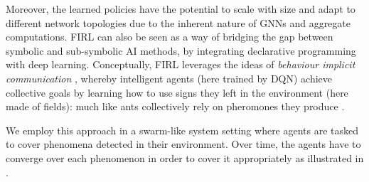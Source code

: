 Moreover, the learned policies have the potential to scale with size and adapt to different network topologies due to the inherent nature of GNNs and aggregate computations.
\ac{FIRL} can also be seen as a way of bridging the gap between symbolic and sub-symbolic AI methods, by integrating declarative programming with deep learning.
%
Conceptually, \ac{FIRL} leverages the ideas of \emph{behaviour implicit communication} \cite{DBLP:journals/ijaci/CastelfranchiPT10} \cite{DBLP:conf/e4mas/TummoliniCRVO04}, whereby intelligent agents (here trained by DQN) achieve collective goals by learning how to use signs they left in the environment (here made of fields): much like ants collectively rely on pheromones they produce \cite{DBLP:journals/anor/Parunak97}.

We employ this approach in a swarm-like system setting where agents are tasked to cover phenomena detected in their environment. 
Over time, the agents have to converge over each phenomenon in order to cover it appropriately as illustrated in .
